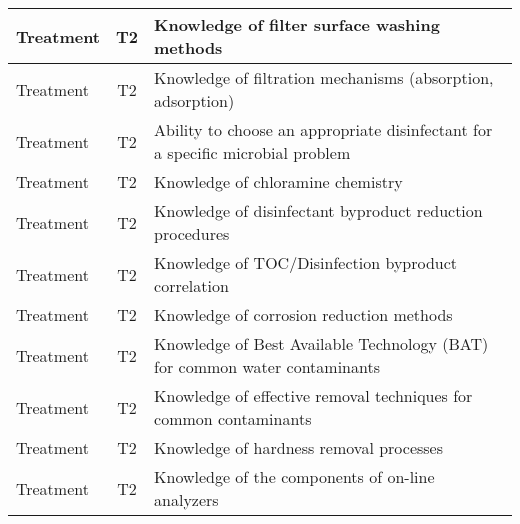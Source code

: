 \documentclass{article}
\begin{document}
\begin{table}[]
\begin{tabular}{|l|c|l|}
Treatment                              & T2             & Knowledge of filter   surface washing methods                                                                                     \\ \hline
Treatment                              & T2             & Knowledge of   filtration mechanisms (absorption, adsorption)                                                                     \\ \hline
Treatment                              & T2             & Ability to choose an   appropriate disinfectant for a specific microbial problem                                                  \\ \hline
Treatment                              & T2             & Knowledge of   chloramine chemistry                                                                                               \\ \hline
Treatment                              & T2             & Knowledge of   disinfectant byproduct reduction procedures                                                                        \\ \hline
Treatment                              & T2             & Knowledge of   TOC/Disinfection byproduct correlation                                                                             \\ \hline
Treatment                              & T2             & Knowledge of   corrosion reduction methods                                                                                        \\ \hline
Treatment                              & T2             & Knowledge of Best   Available Technology (BAT) for common water contaminants                                                      \\ \hline
Treatment                              & T2             & Knowledge of   effective removal techniques for common contaminants                                                               \\ \hline
Treatment                              & T2             & Knowledge of hardness   removal processes                                                                                         \\ \hline
Treatment                              & T2             & Knowledge of the   components of on-line analyzers                                                                                \\ \hline

\end{tabular}
\end{table}
\end{document}
